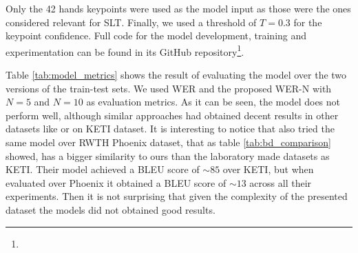 Only the 42 hands keypoints were used as the model input as those were the ones considered relevant for SLT. Finally, we used a threshold of \(T=0.3\) for the keypoint confidence. Full code for the model development, training and experimentation can be found in its GitHub repository\footnote{\modelrepourl}.



Table \ref{tab:model_metrics} shows the result of evaluating the model over the two versions of the train-test sets. We used WER and the proposed WER-N with \(N=5\) and \(N=10\) as evaluation metrics. As it can be seen, the model does not perform well, although similar approaches had obtained decent results in other datasets like \cite{ko2019neural} or \cite{kim2022keypoint} on KETI dataset. It is interesting to notice that \cite{kim2022keypoint} also tried the same model over RWTH Phoenix dataset, that as table \ref{tab:bd_comparison} showed, has a bigger similarity to ours than the laboratory made datasets as KETI. Their model achieved a BLEU score of \(\sim85\) over KETI, but when evaluated over Phoenix it obtained a BLEU score of \(\sim13\) across all their experiments. Then it is not surprising that given the complexity of the presented dataset the models did not obtained good results.
